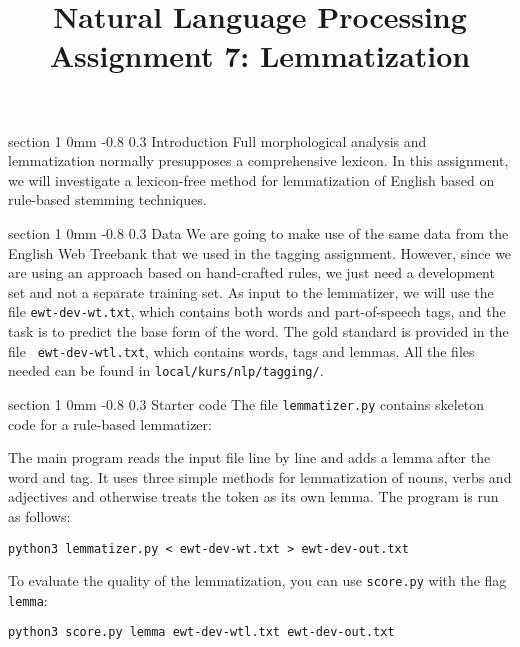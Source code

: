 \documentclass[11pt]{article}
\title{{\LARGE Natural Language Processing}\\[1.5mm]{\large Assignment 7: Lemmatization}}
\author{}
\date{} %
\makeatletter
\newcommand{\newsec}[2]{\section{#1}\label{sec:#2}\noindent}
\renewcommand{\section}{\@startsection
{section}%
{1}%
{0mm}%
{-0.8\baselineskip}%
{0.3\baselineskip}%
{\bfseries\large}}%
\makeatother
\begin{document}
 

\maketitle
\vspace{-2mm} \newsec{Introduction}{intro}%
Full morphological analysis and lemmatization normally presupposes a
comprehensive lexicon. In this assignment, we will investigate a
lexicon-free method for lemmatization of English based on rule-based
stemming techniques.

\newsec{Data}{data}%
We are going to make use of the same data from the English Web
Treebank that we used in the tagging assignment. However, since we are
using an approach based on hand-crafted rules, we just need a
development set and not a separate training set. As input to the
lemmatizer, we will use the file {\tt ewt-dev-wt.txt}, which contains
both words and part-of-speech tags, and the task is to predict the
base form of the word. The gold standard is provided in the file {\tt
  ewt-dev-wtl.txt}, which contains words, tags and lemmas.  All the
files needed can be found in {\tt local/kurs/nlp/tagging/}.

\newsec{Starter code}{code}%
The file {\tt lemmatizer.py} contains skeleton code for a rule-based lemmatizer:
\begin{center}
\fbox{

}
\end{center}
The main program reads the input file line by line and adds a lemma
after the word and tag. It uses three simple methods for lemmatization
of nouns, verbs and adjectives and otherwise treats the token as its
own lemma. The program is run as follows:
\begin{verbatim}
python3 lemmatizer.py < ewt-dev-wt.txt > ewt-dev-out.txt
\end{verbatim}
To evaluate the quality of the lemmatization, you can use {\tt score.py} with the flag {\tt lemma}:
\begin{verbatim}
python3 score.py lemma ewt-dev-wtl.txt ewt-dev-out.txt
\end{verbatim}
\end{document}
